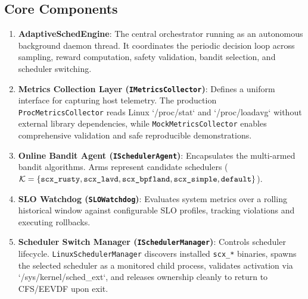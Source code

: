 \documentclass[journal]{IEEEtran}
\begin{document}
\subsection{Core Components}
\begin{enumerate}
    \item \textbf{AdaptiveSchedEngine}: The central orchestrator running as an autonomous background daemon thread. It coordinates the periodic decision loop across sampling, reward computation, safety validation, bandit selection, and scheduler switching.
    \item \textbf{Metrics Collection Layer (\texttt{IMetricsCollector})}: Defines a uniform interface for capturing host telemetry. The production \texttt{ProcMetricsCollector} reads Linux `/proc/stat` and `/proc/loadavg` without external library dependencies, while \texttt{MockMetricsCollector} enables comprehensive validation and safe reproducible demonstrations.
    \item \textbf{Online Bandit Agent (\texttt{ISchedulerAgent})}: Encapsulates the multi-armed bandit algorithms. Arms represent candidate schedulers ($\mathcal{K} = \{\text{\texttt{scx\_rusty}}, \text{\texttt{scx\_lavd}}, \text{\texttt{scx\_bpfland}}, \text{\texttt{scx\_simple}}, \text{\texttt{default}}\}$).
    \item \textbf{SLO Watchdog (\texttt{SLOWatchdog})}: Evaluates system metrics over a rolling historical window against configurable SLO profiles, tracking violations and executing rollbacks.
    \item \textbf{Scheduler Switch Manager (\texttt{ISchedulerManager})}: Controls scheduler lifecycle. \texttt{LinuxSchedulerManager} discovers installed \texttt{scx\_*} binaries, spawns the selected scheduler as a monitored child process, validates activation via `/sys/kernel/sched\_ext`, and releases ownership cleanly to return to CFS/EEVDF upon exit.
\end{enumerate}
\end{document}
